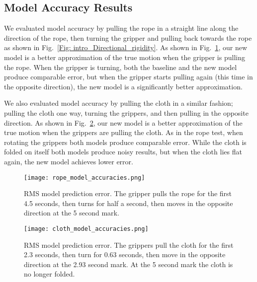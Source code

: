 \subsection{Model Accuracy Results} \label{Results:accuracy}




We evaluated model accuracy by pulling the rope in a straight line along the direction of the rope, then turning the gripper and pulling back towards the rope as shown in Fig.~\ref{Fig: intro_Directional_rigidity}. As shown in Fig.~\ref{Fig: rope_model_accuracy_plot}, our new model is a better approximation of the true motion when the gripper is pulling the rope. When the gripper is turning, both the baseline and the new model produce comparable error, but when the gripper starts pulling again (this time in the opposite direction), the new model is a significantly better approximation.

We also evaluated model accuracy by pulling the cloth in a similar fashion; pulling the cloth one way, turning the grippers, and then pulling in the opposite direction. As shown in Fig.~\ref{Fig: cloth_model_accuracy_plot}, our new model is a better approximation of the true motion when the grippers are pulling the cloth. As in the rope test, when rotating the grippers both models produce comparable error. While the cloth is folded on itself both models produce noisy results, but when the cloth lies flat again, the new model achieves lower error.

\begin{figure}[t]
    \centering
    \texttt{[image: rope\_model\_accuracies.png]}
    \caption{RMS model prediction error. The gripper pulls the rope for the first 4.5 seconds, then turns for half a second, then moves in the opposite direction at the 5 second mark.}
    \label{Fig: rope_model_accuracy_plot}
\end{figure}

\begin{figure}[t]
    \centering
    \texttt{[image: cloth\_model\_accuracies.png]}
    \caption{RMS model prediction error. The grippers pull the cloth for the first 2.3 seconds, then turn for 0.63 seconds, then move in the opposite direction at the 2.93 second mark. At the 5 second mark the cloth is no longer folded. }
    \label{Fig: cloth_model_accuracy_plot}
\end{figure}









